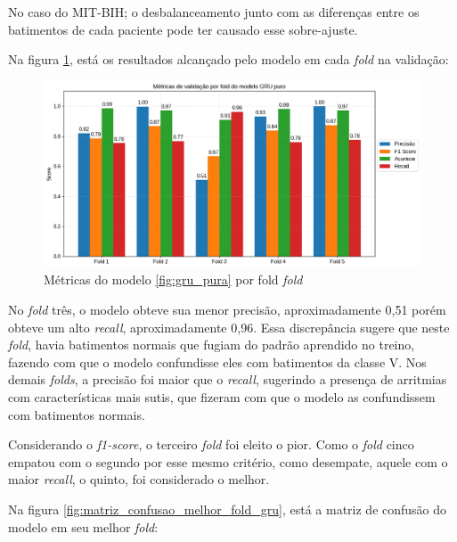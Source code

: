 \documentclass[
    12pt,                %
    openright,           %
    oneside,             %
    a4paper,             %
    brazil               %
]{abntex2}
\begin{document}
No caso do MIT-BIH; o desbalanceamento junto com as diferenças entre os batimentos de cada paciente pode ter causado esse sobre-ajuste.

Na figura \ref{fig:gru_resultados_por_fold}, está os resultados alcançado pelo modelo em cada \textit{fold} na validação:

\begin{figure}[H]
  \centering
   \includegraphics[width=1.0\textwidth]{figuras/modelos_resultados/gru/gru_metricas_por_fold.png} %
  \caption{Métricas do modelo \ref{fig:gru_pura} por fold \textit{fold}}
  \label{fig:gru_resultados_por_fold}
\end{figure}

No \textit{fold} três, o modelo obteve sua menor precisão, aproximadamente 0,51 porém obteve um alto \textit{recall}, aproximadamente 0,96.
Essa discrepância sugere que neste \textit{fold}, havia batimentos normais que fugiam do padrão aprendido no treino, fazendo com que o modelo
confundisse eles com batimentos da classe V. Nos demais \textit{folds}, a precisão foi maior que o \textit{recall}, sugerindo a presença 
de arritmias com características mais sutis, que fizeram com que o modelo as confundissem com batimentos normais.

Considerando o \textit{f1-score}, o terceiro \textit{fold} foi eleito o pior. Como o \textit{fold} cinco empatou com o segundo por 
esse mesmo critério, como desempate, aquele com o maior \textit{recall}, o quinto, foi considerado o melhor. 

Na figura \ref{fig:matriz_confusao_melhor_fold_gru}, está a matriz de  confusão do modelo em seu melhor \textit{fold}:
\end{document}
